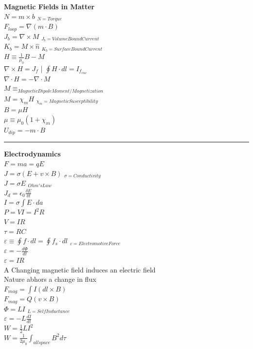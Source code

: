 \documentclass[1pt]{report}
\begin{document}
\begin{multicols}{3}
\begin{flushleft}
\textbf{Magnetic Fields in Matter}\\
$N=m\times b$ $_{N=Torque}$\\
$F_{loop}=\nabla(m\cdot B)$\\
$J_b=\nabla\times M$ $_{J_b=VolumeBoundCurrent}$\\
$K_b=M\times\hat{n}$ $_{K_b=SurfaceBoundCurrent}$\\
$H\equiv\frac{1}{\mu_0}B-M$\\
$\nabla\times H=J_f$ | $\oint H\cdot dl=I_{f_{enc}}$\\
$\nabla\cdot H=-\nabla\cdot M$\\
$M\equiv _{MagneticDipoleMoment/Magnetization}$\\
$M=\chi_m H$ $_{\chi_m=MagneticSusceptibility}$\\
$B=\mu H$\\
$\mu\equiv\mu_0 (1+\chi_m)$\\
$U_{dip}=-m\cdot B$\\

\noindent\rule[0.5ex]{\linewidth}{1pt}

\textbf{Electrodynamics}\\
$F=ma=qE$\\
$J=\sigma(E+v\times B)$ $_{\sigma=Conductivity}$\\
$J=\sigma E$ $_{Ohm's Law}$\\
$J_d=\epsilon_0\frac{\delta E}{\delta t}$\\
$I=\sigma\int E\cdot da$\\
$P=VI=I^2R$\\
$V=IR$\\
$\tau=RC$\\
$\varepsilon\equiv\oint f\cdot dl=\oint f_s\cdot dl$ $_{\varepsilon=ElectromotiveForce}$\\
$\varepsilon=-\frac{d\Phi}{dt}$\\
$\varepsilon=IR$\\
A Changing magnetic field induces an electric field\\
Nature abhors a change in flux\\
$F_{mag}=\int I(dl\times B)$\\
$F_{mag}=Q(v\times B)$\\
$\Phi=LI$ $_{L=SelfInductance}$\\
$\varepsilon=-L\frac{dI}{dt}$\\
$W=\frac{1}{2}LI^2$\\
$W=\frac{1}{2\mu_0}\int_{all space} B^2d\tau$\\


\end{flushleft}
\end{multicols}
\end{document}
